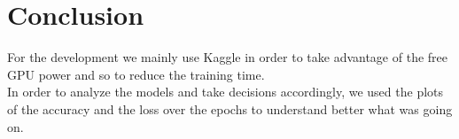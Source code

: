 \documentclass[11pt]{article}
\begin{document}
\section*{Conclusion}
For the development we mainly use Kaggle in order to take advantage of the free GPU power and so to reduce the training time.\\
In order to analyze the models and take decisions accordingly, we used the plots of the accuracy and the loss over the epochs to understand better what was going on.
\end{document}
